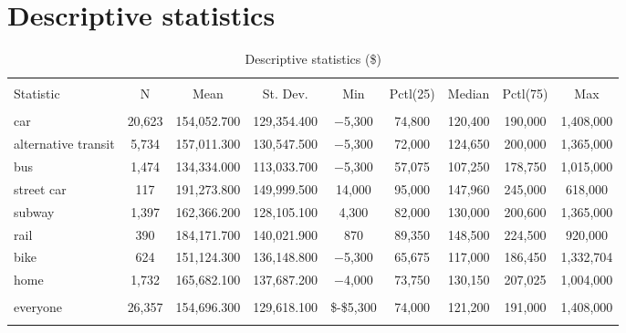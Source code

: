 \documentclass[10pt,a4paper]{article}
\begin{document}
\section*{Descriptive statistics}
\begin{table}[!htbp] \centering 
  \caption{Descriptive statistics (\$)} 
  \label{} 
\begin{tabular}{@{\extracolsep{5pt}}lcccccccc} 
\\[-1.8ex]\hline 
\hline \\[-1.8ex] 
Statistic & \multicolumn{1}{c}{N} & \multicolumn{1}{c}{Mean} & \multicolumn{1}{c}{St. Dev.} & \multicolumn{1}{c}{Min} & \multicolumn{1}{c}{Pctl(25)} & \multicolumn{1}{c}{Median} & \multicolumn{1}{c}{Pctl(75)} & \multicolumn{1}{c}{Max} \\ 
\hline \\[-1.8ex] 
car & 20,623 & 154,052.700 & 129,354.400 & $-$5,300 & 74,800 & 120,400 & 190,000 & 1,408,000 \\ 
alternative transit & 5,734 & 157,011.300 & 130,547.500 & $-$5,300 & 72,000 & 124,650 & 200,000 & 1,365,000 \\ 
bus & 1,474 & 134,334.000 & 113,033.700 & $-$5,300 & 57,075 & 107,250 & 178,750 & 1,015,000 \\ 
street car & 117 & 191,273.800 & 149,999.500 & 14,000 & 95,000 & 147,960 & 245,000 & 618,000 \\ 
subway & 1,397 & 162,366.200 & 128,105.100 & 4,300 & 82,000 & 130,000 & 200,600 & 1,365,000 \\ 
rail & 390 & 184,171.700 & 140,021.900 & 870 & 89,350 & 148,500 & 224,500 & 920,000 \\ 
bike & 624 & 151,124.300 & 136,148.800 & $-$5,300 & 65,675 & 117,000 & 186,450 & 1,332,704 \\ 
home & 1,732 & 165,682.100 & 137,687.200 & $-$4,000 & 73,750 & 130,150 & 207,025 & 1,004,000 \\
\hline \\[-1.8 ex]
everyone & 26,357 & 154,696.300 & 129,618.100 & \$-\$5,300 & 74,000 & 121,200 & 191,000 & 1,408,000 \\
\hline \\[-1.8ex] 
\end{tabular} 
\end{table}
\end{document}
